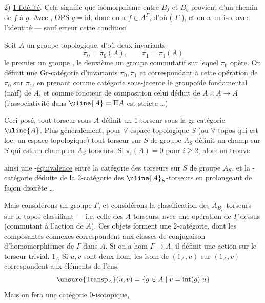 
2) \uline{1-fidélité}. Cela signifie  que \unsure{\(\forall\)} isomorphisme entre  \(B_f\) et \(B_g\) provient d'un  chemin de \(f\) à \(g\). Avec , OPS \(g=\mathrm{id}\), donc on a \(f\in A^{\Gamma}\), d'où  (  \(\Gamma\) ), et on a un iso. avec l'identité --- sauf erreur cette condition


Soit \(A\) un groupe topologique, d'où deux invariants
\[
\pi_0=\pi_0(A),\qquad \pi_1=\pi_1(A)
\]
le premier un groupe ,  le deuxième un groupe commutatif sur lequel \(\pi_0\) opère. On définit une Gr-catégorie  d'invariants \(\pi_0,\pi_1\) et correspondant à cette opération de \(\pi_0\) sur \(\pi_1\), en prenant comme catégorie sous-jacente le  groupoïde  fondamental (naïf) de \(A\), et comme foncteur de composition celui déduit de \(A\times A\to A\) (l'associativité dans \(\uline{A}=\Pi A\) est stricte \ldots)

Ceci posé, tout torseur sous \(A\) définit un 1-torseur sous la gr-catégorie \(\uline{A}\). Plus généralement, pour \(\forall\) espace topologique \(S\) (ou \(\forall\) topos qui est loc. un espace topologique) tout torseur sur \(S\) de groupe \(A_S\) définit un champ sur \(S\) qui est un  champ en \(A_S\)-torseurs. Si \(\pi_i(A)=0\) pour \(i\geq2\), alors on trouve


ainsi  une -\uline{équivalence} entre la catégorie des torseurs sur \(S\) de groupe \(A_S\), et la -catégorie déduite de la 2-catégorie des  \(\uline{A}_S\)-torseurs en  prolongeant de façon discrète \ldots

Mais considérons  un groupe \(\Gamma\), et considérons la classification des \(A_{B_\Gamma}\)-torseurs sur le topos classifiant --- i.e. celle des \(A\) torseurs, avec une opération de \(\Gamma\) dessus (commutant à l'action de \(A\)). Ces objets forment une 2-catégorie, dont les composantes connexes correspondent aux classes de conjugaison d'homomorphismes de \(\Gamma\) dans \(A\). Si on a   hom \(\Gamma\to A\), il définit  une action sur le torseur trivial. \(1_A\) Si \(u,v\) sont deux hom, les isom de \((1_A,u)\) sur \((1_A,v)\) correspondent aux éléments de l'ens. 
\[
\unsure{\mathrm{Transp}_A}(u,v)=\{g\in A\mid v=\mathrm{int}(g).u\}
\]
Mais on fera une catégorie 0-isotopique,

